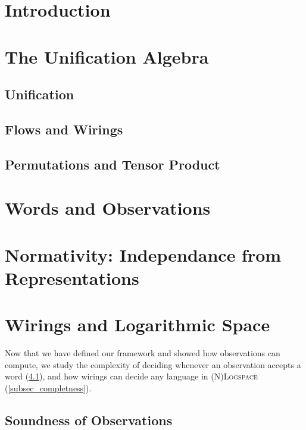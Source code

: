 \section*{Introduction}


\section{The Unification Algebra}\label{sec_unification}
	\subsection{Unification}
	
	\subsection{Flows and Wirings}
	
	\subsection{Permutations and Tensor Product}\label{permutation}
	

\section{Words and Observations}\label{sec_words}
	
	
	
\section{Normativity: Independance from Representations}\label{sec_normativity}
	

\section{Wirings and Logarithmic Space}\label{sec_logspace}
	Now that we have defined our framework and showed how observations can compute, we study the complexity of deciding whenever an observation accepts a word (\ref{subsec_soundness}), and how wirings can decide any language in \textsc{(N)Logspace} (\ref{subsec_completness}).
	\subsection{Soundness of Observations}
	\label{subsec_soundness}
	
